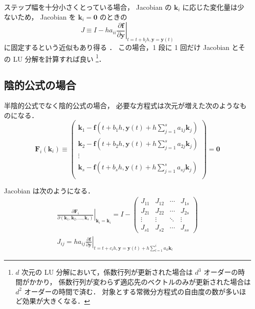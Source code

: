 ステップ幅を十分小さくとっている場合，
Jacobian の $\bm{k}_i$ に応じた変化量は少ないため，
Jacobian を $\bm{k}_i = \bm{0}$ のときの
\begin{equation}
    J \equiv I - h a_{ii}
    \left. \frac{\partial \bm{f}}{\partial \bm{y}}
    \right|_{t = t + b_i h, \bm{y} = \bm{y}(t)}
\end{equation}
に固定するという近似もあり得る
\cite[6.2 節 (c)]{Mitsui1993}．
この場合，1 段に 1 回だけ Jacobian とその LU 分解を計算すれば良い
\footnote{$d$ 次元の LU 分解において，係数行列が更新された場合は $d^3$ オーダーの時間がかかり，%
    係数行列が変わらず適応先のベクトルのみが更新された場合は $d^2$ オーダーの時間で済む．%
    対象とする常微分方程式の自由度の数が多いほど効果が大きくなる．}．

\subsection{陰的公式の場合}

半陰的公式でなく陰的公式の場合，
必要な方程式は次元が増えた次のようなものになる．
\begin{equation}
    \bm{F}_i(\bm{k}_i)
    \equiv
    \begin{pmatrix}
        \bm{k}_1 - \bm{f}\left(t + b_1 h, \bm{y}(t) + h \sum_{j = 1}^s a_{1j} \bm{k}_j \right) \\
        \bm{k}_2 - \bm{f}\left(t + b_2 h, \bm{y}(t) + h \sum_{j = 1}^s a_{2j} \bm{k}_j \right) \\
        \vdots                                                                                 \\
        \bm{k}_s - \bm{f}\left(t + b_s h, \bm{y}(t) + h \sum_{j = 1}^s a_{sj} \bm{k}_j \right) \\
    \end{pmatrix}
    = \bm{0}
\end{equation}

Jacobian は次のようになる．
\begin{align}
    \left. \frac{\partial \bm{F}_i}{\partial (\bm{k}_1, \bm{k}_2, \ldots, \bm{k}_s)}
    \right|_{\bm{k}_i = \bm{k}_i}
    = I -
    \begin{pmatrix}
        J_{11} & J_{12} & \cdots & J_{1s} \\
        J_{21} & J_{22} & \cdots & J_{2s} \\
        \vdots & \vdots & \ddots & \vdots \\
        J_{s1} & J_{s2} & \cdots & J_{ss}
    \end{pmatrix}
    \\
    J_{ij} = h a_{ij} \left. \frac{\partial \bm{f}}{\partial \bm{y}}
    \right|_{t = t + c_i h, \bm{y} = \bm{y}(t) + h \sum_{l = 1}^i a_{il} \bm{k}_l}
\end{align}

